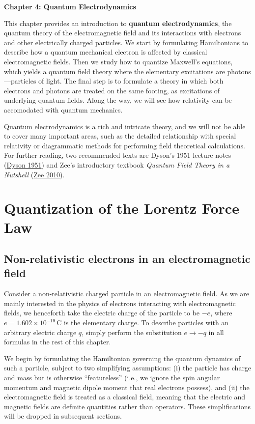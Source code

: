 \documentclass[pra,12pt]{revtex4}
\begin{document}
\begin{center}
{\Large \textbf{Chapter 4: Quantum Electrodynamics}}
\end{center}

This chapter provides an introduction to \textbf{quantum
  electrodynamics}, the quantum theory of the electromagnetic field
and its interactions with electrons and other electrically charged
particles.  We start by formulating Hamiltonians to describe how a
quantum mechanical electron is affected by classical electromagnetic
fields.  Then we study how to quantize Maxwell's equations, which
yields a quantum field theory where the elementary excitations are
photons---particles of light.  The final step is to formulate a theory
in which both electrons and photons are treated on the same footing,
as excitations of underlying quantum fields.  Along the way, we will
see how relativity can be accomodated with quantum mechanics.

Quantum electrodynamics is a rich and intricate theory, and we will
not be able to cover many important areas, such as the detailed
relationship with special relativity or diagrammatic methods for
performing field theoretical calculations.  For further reading, two
recommended texts are Dyson's 1951 lecture notes
(\hyperref[cite:dyson]{Dyson 1951}) and Zee's introductory textbook
\textit{Quantum Field Theory in a Nutshell} (\hyperref[cite:zee]{Zee
  2010}).

\section{Quantization of the Lorentz Force Law}

\subsection{Non-relativistic electrons in an electromagnetic field}
\label{sec:nonrel}

Consider a non-relativistic charged particle in an electromagnetic
field.  As we are mainly interested in the physics of electrons
interacting with electromagnetic fields, we henceforth take the
electric charge of the particle to be $-e$, where $e =
1.602\times10^{-19}\,\mathrm{C}$ is the elementary charge.  To
describe particles with an arbitrary electric charge $q$, simply
perform the substitution $e \rightarrow -q$ in all formulas in the
rest of this chapter.

We begin by formulating the Hamiltonian governing the quantum dynamics
of such a particle, subject to two simplifying assumptions: (i) the
particle has charge and mass but is otherwise ``featureless'' (i.e.,
we ignore the spin angular momentum and magnetic dipole moment that
real electrons possess), and (ii) the electromagnetic field is treated
as a classical field, meaning that the electric and magnetic fields
are definite quantities rather than operators.  These simplifications
will be dropped in subsequent sections.
\end{document}
